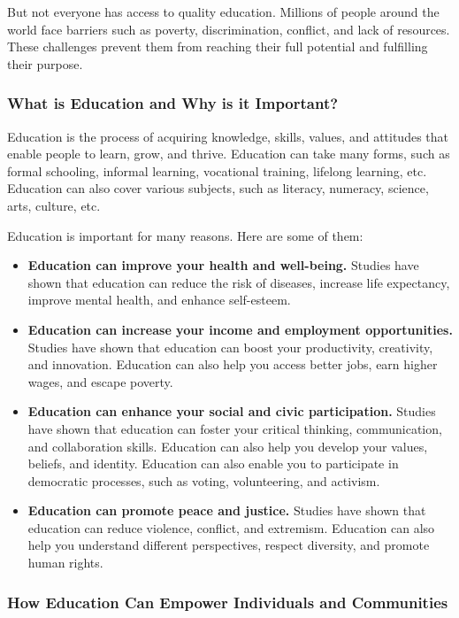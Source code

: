 \documentclass[a4paper,11pt]{article}
\begin{document}
But not everyone has access to quality education. Millions of people around the world face barriers such as poverty, discrimination, conflict, and lack of resources. These challenges prevent them from reaching their full potential and fulfilling their purpose.\cite{education-change-life-world}

\subsubsection{What is Education and Why is it Important?}

Education is the process of acquiring knowledge, skills, values, and attitudes that enable people to learn, grow, and thrive. Education can take many forms, such as formal schooling, informal learning, vocational training, lifelong learning, etc. Education can also cover various subjects, such as literacy, numeracy, science, arts, culture, etc.

Education is important for many reasons. Here are some of them:

\begin{itemize}
	\item \textbf{Education can improve your health and well-being.}
	 Studies have shown that education can reduce the risk of diseases, increase life expectancy, improve mental health, and enhance self-esteem.
	\item \textbf{Education can increase your income and employment opportunities.} 
	 Studies have shown that education can boost your productivity, creativity, and innovation. Education can also help you access better jobs, earn higher wages, and escape poverty.
	\item \textbf{Education can enhance your social and civic participation.} 
	 Studies have shown that education can foster your critical thinking, communication, and collaboration skills. Education can also help you develop your values, beliefs, and identity. Education can also enable you to participate in democratic processes, such as voting, volunteering, and activism.
	\item \textbf{Education can promote peace and justice.}
	 Studies have shown that education can reduce violence, conflict, and extremism. Education can also help you understand different perspectives, respect diversity, and promote human rights.
\end{itemize}

\subsubsection{How Education Can Empower Individuals and Communities}
\end{document}
